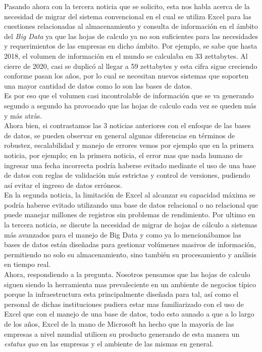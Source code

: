 Pasando ahora con la tercera noticia que se solicito, esta nos habla acerca de la necesidad de migrar del sistema convencional en el cual se utiliza Excel para las cuestiones relacionadas al almacenamiento y consulta de información en el ámbito del \textit{Big Data} ya que las hojas de calculo ya no son suficientes para las necesidades y requerimientos de las empresas en dicho ámbito. Por ejemplo, se sabe que hasta 2018, el volumen de información en el mundo se calculaba en 33 zettabytes. Al cierre de 2020, casi se duplicó al llegar a 59 zettabytes y esta cifra sigue creciendo conforme pasan los años, por lo cual se necesitan nuevos sistemas que soporten una mayor cantidad de datos como lo son las bases de datos. \\

Es por eso que el volumen casi incontrolable de información que se va generando segundo a segundo ha provocado que las hojas de calculo cada vez se queden más y más atrás.  \cite{escobar-2023} \\

Ahora bien, si contrastamos las 3 noticias anteriores con el enfoque de las bases de datos, se pueden observar en general algunas diferencias en términos de robustez, escalabilidad y manejo de errores vemos por ejemplo que en la primera noticia, por ejemplo; en la primera noticia, el error mas que nada humano de ingresar una fecha incorrecta podría haberse evitado mediante el uso de una base de datos con reglas de validación más estrictas y control de versiones, pudiendo así evitar el ingreso de datos erróneos.\\

En la segunda noticia, la limitación de Excel al alcanzar su capacidad máxima se podría haberse evitado utilizando una base de datos relacional o no relacional que puede manejar millones de registros sin problemas de rendimiento. Por ultimo en la tercera noticia, se discute la necesidad de migrar de hojas de cálculo a sistemas más avanzados para el manejo de Big Data y como ya lo mencionábamos las bases de datos están diseñadas para gestionar volúmenes masivos de información, permitiendo no solo su almacenamiento, sino también su procesamiento y análisis en tiempo real. \cite{kde-2023}\\

Ahora, respondiendo a la pregunta. Nosotros pensamos que las hojas de calculo siguen siendo la herramienta mas prevaleciente en un ambiente de negocios típico porque la infraestructura esta principalmente diseñada para tal, así como el personal de dichas instituciones pudiera estar mas familiarizado con el uso de Excel que con el manejo de una base de datos, todo esto aunado a que a lo largo de los años, Excel de la mano de Microsoft ha hecho que la mayoría de las empresas a nivel mundial utilicen su producto generando de esta manera un \textit{estatus quo} en las empresas y el ambiente de las mismas en general. \\

